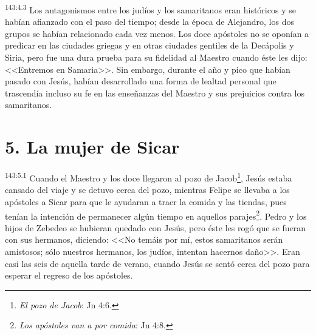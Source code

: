 \par 
\textsuperscript{143:4.3} Los antagonismos entre los judíos y los samaritanos eran históricos y se habían afianzado con el paso del tiempo; desde la época de Alejandro, los dos grupos se habían relacionado cada vez menos. Los doce apóstoles no se oponían a predicar en las ciudades griegas y en otras ciudades gentiles de la Decápolis y Siria, pero fue una dura prueba para su fidelidad al Maestro cuando éste les dijo: <<Entremos en Samaria>>. Sin embargo, durante el año y pico que habían pasado con Jesús, habían desarrollado una forma de lealtad personal que trascendía incluso su fe en las enseñanzas del Maestro y sus prejuicios contra los samaritanos.

\section*{5. La mujer de Sicar}
\par 
\textsuperscript{143:5.1} Cuando el Maestro y los doce llegaron al pozo de Jacob\footnote{\textit{El pozo de Jacob}: Jn 4:6.}, Jesús estaba cansado del viaje y se detuvo cerca del pozo, mientras Felipe se llevaba a los apóstoles a Sicar para que le ayudaran a traer la comida y las tiendas, pues tenían la intención de permanecer algún tiempo en aquellos parajes\footnote{\textit{Los apóstoles van a por comida}: Jn 4:8.}. Pedro y los hijos de Zebedeo se hubieran quedado con Jesús, pero éste les rogó que se fueran con sus hermanos, diciendo: <<No temáis por mí, estos samaritanos serán amistosos; sólo nuestros hermanos, los judíos, intentan hacernos daño>>. Eran casi las seis de aquella tarde de verano, cuando Jesús se sentó cerca del pozo para esperar el regreso de los apóstoles.

